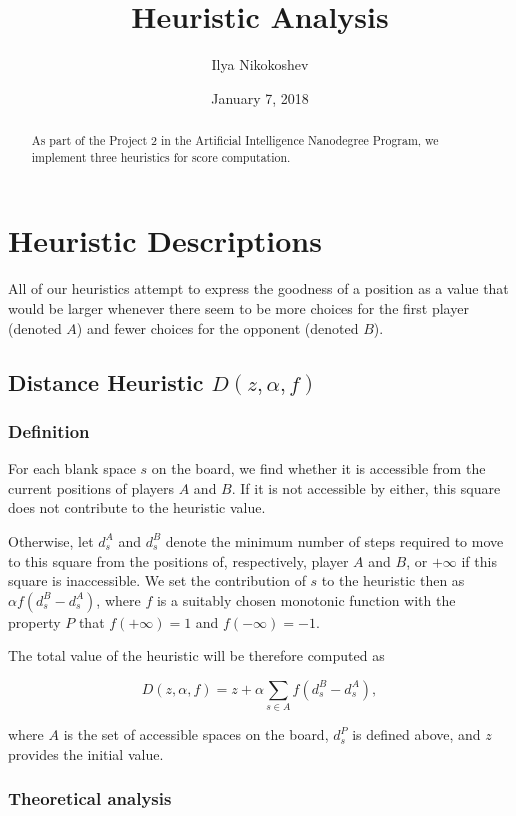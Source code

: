 \documentclass[oneside]{article}   	%
\title{Heuristic Analysis}
\author{Ilya Nikokoshev}
\date{January 7, 2018}
\begin{document}
\maketitle

\begin{abstract}
As part of the Project 2 in the Artificial Intelligence Nanodegree Program, we implement three heuristics for score computation.
\end{abstract}

\tableofcontents

\section{Heuristic Descriptions}

All of our heuristics attempt to express the goodness of a position as a value that would be larger whenever there seem to be more choices for the first player (denoted $A$) and fewer choices for the opponent (denoted $B$).


\subsection{Distance Heuristic $D(z, \alpha, f)$}

\subsubsection{Definition}

For each blank space $s$ on the board, we find whether it is accessible from the current positions of players $A$ and $B$. If it is not accessible by either, this square does not contribute to the heuristic value. 

Otherwise, let $d^A_s$ and $d^B_s$ denote the minimum number of steps required to move to this square from the positions of, respectively, player $A$ and $B$, or $+\infty$ if this square is inaccessible. We set the contribution of $s$ to the heuristic then as $\alpha f(d^B_s-d^A_s)$,
where $f$ is a suitably chosen monotonic function with the property $P$ that $f(+\infty) = 1$ and $f(-\infty) = -1$. 

The total value of the heuristic will be therefore computed as 

$$D(z, \alpha, f) = z + \alpha\sum_{s\in A}f(d^B_s-d^A_s), $$

where $A$ is the set of accessible spaces on the board, $d^P_s$ is defined above, and $z$ provides the initial value.

\subsubsection{Theoretical analysis}
\label{DistanceAnalysis}
\end{document}
